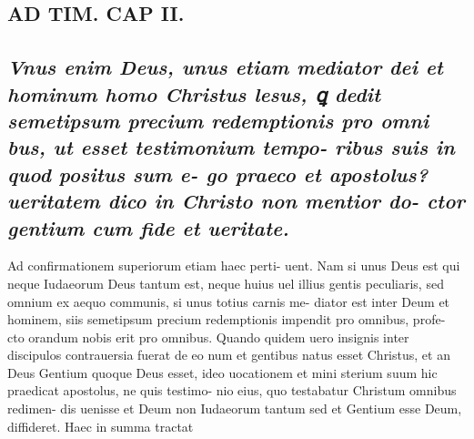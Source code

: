 \documentclass{article}
\begin{document}
\begin{pages}
\section*{AD TIM. CAP II. }
\marginpar{[ p.116 ]} 
{}
\subsection*{\textit{Vnus enim Deus, unus etiam mediator dei et hominum homo Christus lesus, ꝗ dedit semetipsum precium redemptionis pro omni bus, ut esset testimonium tempo- ribus suis in quod positus sum e- go praeco et apostolus? ueritatem dico in Christo non mentior do- ctor gentium cum fide et ueritate. }}\pstart Ad confirmationem superiorum etiam haec perti- uent. Nam si unus Deus est qui neque Iudaeorum Deus tantum est, neque huius uel illius gentis peculiaris, sed omnium ex aequo communis, si unus totius carnis me- diator est inter Deum et hominem, siis semetipsum precium redemptionis impendit pro omnibus, profe- cto orandum nobis erit pro omnibus. Quando quidem uero insignis inter discipulos contrauersia fuerat de eo num et gentibus natus esset Christus, et an Deus Gentium quoque Deus esset, ideo uocationem et mini sterium suum hic praedicat apostolus, ne quis testimo- nio eius, quo testabatur Christum omnibus redimen- dis uenisse et Deum non Iudaeorum tantum sed et Gentium esse Deum, diffideret. Haec in summa tractat  \pend

\end{pages}
\end{document}
